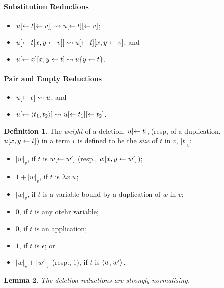 \documentclass[11pt,a4paper]{article}
\theoremstyle{definition}
\newtheorem{definition}{Definition}
\theoremstyle{plain}
\newtheorem{lemma}[definition]{Lemma}
\theoremstyle{remark}
\begin{document}
\paragraph{Substitution Reductions}

\begin{itemize}
	\item $u{[\leftarrow{t{[\leftarrow{v}]}}]}\rightsquigarrow u{[\leftarrow{t}]}{[\leftarrow{v}]}$;
	\item $u{[\leftarrow{t{[{x},{y}\leftarrow{v}]}}]}\rightsquigarrow u{[\leftarrow{t}]}{[{x},{y}\leftarrow{v}]}$; and
	\item $u{[\leftarrow{x}]}{[{x},{y}\leftarrow{t}]}\rightsquigarrow u\{y\leftarrow t\}$.
\end{itemize}

\paragraph{Pair and Empty Reductions}

\begin{itemize}
	\item $u{[\leftarrow{\epsilon}]}\rightsquigarrow u$; and
	\item $u{[\leftarrow{{\langle{t_1},{t_2}\rangle}}]}\rightsquigarrow u{[\leftarrow{t_1}]}{[\leftarrow{t_2}]}$.
\end{itemize}

\begin{definition}
	The \emph{weight} of a deletion, $u{[\leftarrow{t}]}$, (resp, of a duplication, $u{[{x},{y}\leftarrow{t}]}$) in a term $v$ is defined to be the \emph{size} of $t$ in $v$, $|t|_v$:
	\begin{itemize}
		\item $|w|_v$, if $t$ is $w{[\leftarrow{w'}]}$ (resp., $w{[{x},{y}\leftarrow{w'}]}$);
		\item $1+|w|_v$, if $t$ is $\lambda x.w$;
		\item $|w|_v$, if $t$ is a variable bound by a duplication of $w$ in $v$;
		\item $0$, if $t$ is any otehr variable;
		\item $0$, if $t$ is an application;
		\item $1$, if $t$ is $\epsilon$; or
		\item $|w|_v+|w'|_v$ (resp., 1), if $t$ is ${\langle{w},{w'}\rangle}$.
	\end{itemize}
\end{definition}

\begin{lemma}
The deletion reductions are strongly normalising.
\end{lemma}
\end{document}
